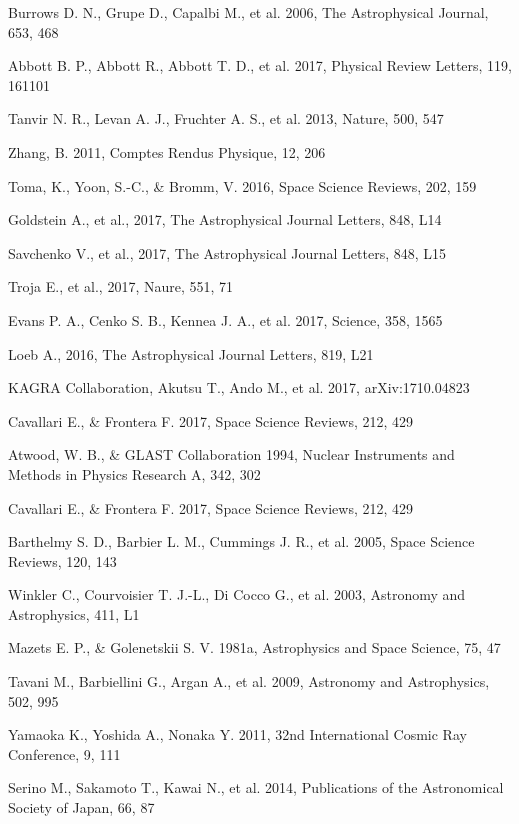 \documentclass[12pt, a4paper,titlepage]{article}
\numberwithin{equation}{section}
\numberwithin{figure}{section}
\begin{document}
\begin{thebibliography}{99}
 Burrows D. N., Grupe D., Capalbi M., et al. 2006, The Astrophysical Journal, 653, 468

 Abbott B. P., Abbott R., Abbott T. D., et al. 2017, Physical Review Letters, 119, 161101

 Tanvir N. R., Levan A. J., Fruchter A. S., et al. 2013, Nature, 500, 547

 Zhang, B. 2011, Comptes Rendus Physique, 12, 206

 Toma, K., Yoon, S.-C., \& Bromm, V. 2016, Space Science Reviews, 202, 159

 Goldstein A., et al., 2017, The Astrophysical Journal Letters, 848, L14

 Savchenko V., et al., 2017, The Astrophysical Journal Letters, 848, L15

 Troja E., et al., 2017, Naure, 551, 71

 Evans P. A., Cenko S. B., Kennea J. A., et al. 2017, Science, 358, 1565

 Loeb A., 2016, The Astrophysical Journal Letters, 819, L21

 KAGRA Collaboration, Akutsu T., Ando M., et al. 2017, arXiv:1710.04823

 Cavallari E., \& Frontera F. 2017, Space Science Reviews, 212, 429
 
 Atwood, W. B., \& GLAST Collaboration 1994, Nuclear Instruments and Methods in Physics Research
A, 342, 302

 Cavallari E., \& Frontera F. 2017, Space Science Reviews, 212, 429

 Barthelmy S. D., Barbier L. M., Cummings J. R., et al. 2005, Space Science Reviews, 120, 143

 Winkler C., Courvoisier T. J.-L., Di Cocco G., et al. 2003, Astronomy and Astrophysics, 411, L1

 Mazets E. P., \& Golenetskii S. V. 1981a, Astrophysics and Space Science, 75, 47

 Tavani M., Barbiellini G., Argan A., et al. 2009, Astronomy and Astrophysics, 502, 995

 Yamaoka K., Yoshida A., Nonaka Y. 2011, 32nd International Cosmic Ray Conference, 9, 111

 Serino M., Sakamoto T., Kawai N., et al. 2014, Publications of the Astronomical Society of Japan, 66,
87


\end{thebibliography}
\end{document}
